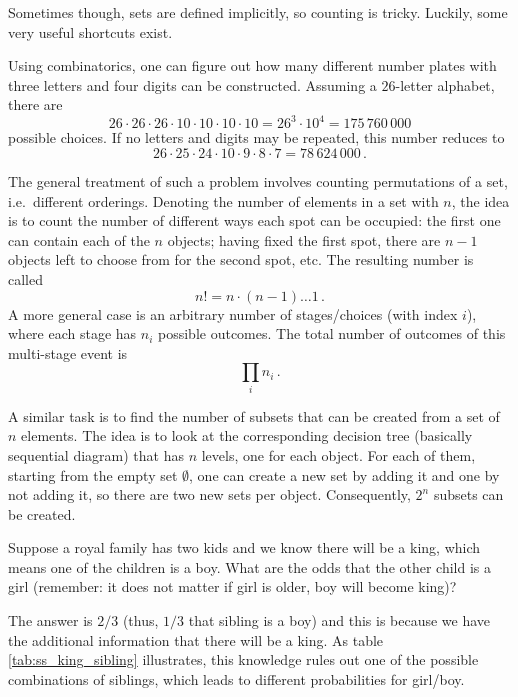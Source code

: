 Sometimes though, sets are defined implicitly, so counting is tricky. Luckily, some very useful shortcuts exist.

\begin{ex}
Using combinatorics, one can figure out how many different number plates with three letters and four digits can be constructed. Assuming a $26$-letter alphabet, there are
\begin{equation*}
26 \cdot 26 \cdot 26 \cdot 10 \cdot 10 \cdot 10 \cdot 10 = 26^3 \cdot 10^4 = 175 \, 760 \, 000
\end{equation*}
possible choices. If no letters and digits may be repeated, this number reduces to
\begin{equation}
26 \cdot 25 \cdot 24 \cdot 10 \cdot 9 \cdot 8 \cdot 7 = 78 \, 624 \, 000 \, .
\end{equation}
\end{ex}

The general treatment of such a problem involves counting permutations of a set, i.e.~different orderings. Denoting the number of elements in a set with $n$, the idea is to count the number of different ways each spot can be occupied: the first one can contain each of the $n$ objects; having fixed the first spot, there are $n - 1$ objects left to choose from for the second spot, etc. The resulting number is called 
\begin{equation}
n! = n \cdot (n - 1) \dots 1 \, .
\end{equation}
A more general case is an arbitrary number of stages/choices (with index $i$), where each stage has $n_i$ possible outcomes. The total number of outcomes of this multi-stage event is
\begin{equation}
\prod_i n_i \, .
\end{equation}

A similar task is to find the number of subsets that can be created from a set of $n$ elements. The idea is to look at the corresponding decision tree (basically sequential diagram) that has $n$ levels, one for each object. For each of them, starting from the empty set $\emptyset$, one can create a new set by adding it and one by not adding it, so there are two new sets per object. Consequently, $2^n$ subsets can be created.


\begin{ex}
Suppose a royal family has two kids and we know there will be a king, which means one of the children is a boy. What are the odds that the other child is a girl (remember: it does not matter if girl is older, boy will become king)?

The answer is $2/ 3$ (thus, $1/ 3$ that sibling is a boy) and this is because we have the additional information that there will be a king. As table \ref{tab:ss_king_sibling} illustrates, this knowledge rules out one of the possible combinations of siblings, which leads to different probabilities for girl/boy.
\end{ex}


